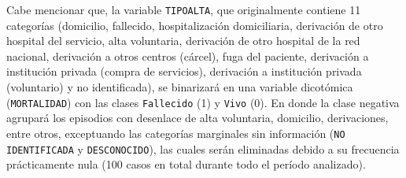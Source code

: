 Cabe mencionar que, la variable \texttt{TIPOALTA}, que originalmente contiene 11 categorías (domicilio, fallecido, hospitalización domiciliaria, derivación de otro hospital del servicio, alta voluntaria, derivación de otro hospital de la red nacional, derivación a otros centros (cárcel), fuga del paciente, derivación a institución privada (compra de servicios), derivación a institución privada (voluntario) y no identificada), se binarizará en una variable dicotómica (\texttt{MORTALIDAD}) con las clases \texttt{Fallecido} (1) y \texttt{Vivo} (0). En donde la clase negativa agrupará los episodios con desenlace de alta voluntaria, domicilio, derivaciones, entre otros, exceptuando las categorías marginales sin información (\texttt{NO IDENTIFICADA} y \texttt{DESCONOCIDO}), las cuales serán eliminadas debido a su frecuencia prácticamente nula (100 casos en total durante todo el período analizado).

